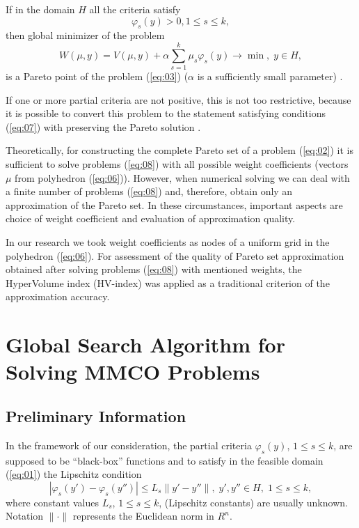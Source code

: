 \documentclass[runningheads]{llncs}
\begin{document}
If in the domain $H$ all the criteria satisfy
\begin{equation}
    \label{eq:07}
    \varphi_s(y) > 0, 1 \leq s \leq k,
\end{equation}
then global minimizer of the problem
\begin{equation}
    \label{eq:08}
    W(\mu, y) = V(\mu, y) + \alpha \sum_{s=1}^k \mu_s \varphi_s(y) \to \min, \; y \in H,
\end{equation}
is a Pareto point of the problem (\ref{eq:03}) ($\alpha$  is a sufficiently small parameter) \cite{Wierzbicki,Marler2004}.

If one or more partial criteria are not positive, this is not too restrictive, because it is possible to convert this problem to the statement satisfying conditions (\ref{eq:07}) with preserving the Pareto solution \cite{Pardalos2017}.

Theoretically, for constructing the complete Pareto set of a problem (\ref{eq:02}) it is sufficient to solve problems (\ref{eq:08}) with all possible weight coefficients (vectors $\mu$ from polyhedron (\ref{eq:06})). However, when numerical solving we can deal with a finite number of problems (\ref{eq:08}) and, therefore, obtain only an approximation of the Pareto set. In these circumstances, important aspects are choice of weight coefficient and evaluation of approximation quality.

In our research we took weight coefficients as nodes of a uniform grid in the polyhedron (\ref{eq:06}). For assessment of the quality of Pareto set approximation obtained after solving problems (\ref{eq:08}) with mentioned weights, the HyperVolume index (HV-index) \cite{Evtushenko2014,Gergel2018} was applied as a traditional criterion of the approximation accuracy.


\section{Global Search Algorithm for Solving MMCO Problems}\label{sec:3}

\subsection{Preliminary Information}

In the framework of our consideration, the partial criteria $\varphi_s(y)$, $1 \leq s \leq k$, are supposed to be ``black-box'' functions and to satisfy in the feasible domain (\ref{eq:01}) the Lipschitz condition
\begin{equation}
    \label{eq:09}
    |\varphi_s(y') - \varphi_s(y'')| \leq L_s \|y'-y''\|, \; y', y'' \in H, \; 1 \leq s \leq k,
\end{equation}
where constant values $L_s$, $1 \leq s \leq k$, (Lipschitz constants) are usually unknown. Notation $\| \cdot \|$ represents the Euclidean norm in $R^n$.  
\end{document}
